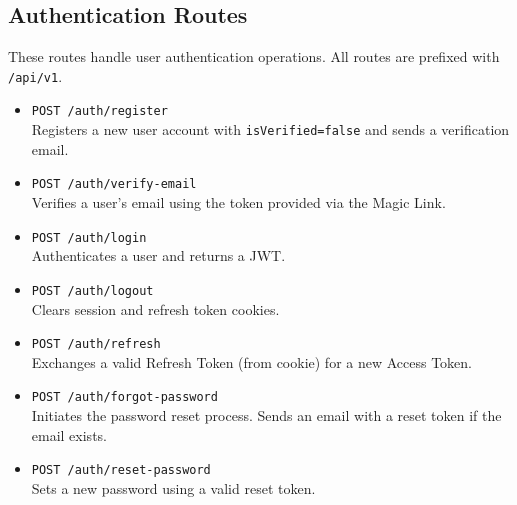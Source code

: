 \subsection{Authentication Routes}
These routes handle user authentication operations. All routes are prefixed with \texttt{/api/v1}.
\begin{itemize}
    \item \texttt{POST /auth/register} \\
    Registers a new user account with \texttt{isVerified=false} and sends a verification email.
    \item \texttt{POST /auth/verify-email} \\
    Verifies a user's email using the token provided via the Magic Link.
    \item \texttt{POST /auth/login} \\
    Authenticates a user and returns a JWT.
    \item \texttt{POST /auth/logout} \\
    Clears session and refresh token cookies.
    \item \texttt{POST /auth/refresh} \\
    Exchanges a valid Refresh Token (from cookie) for a new Access Token.
    \item \texttt{POST /auth/forgot-password} \\
    Initiates the password reset process. Sends an email with a reset token if the email exists.
    \item \texttt{POST /auth/reset-password} \\
    Sets a new password using a valid reset token.
\end{itemize}

